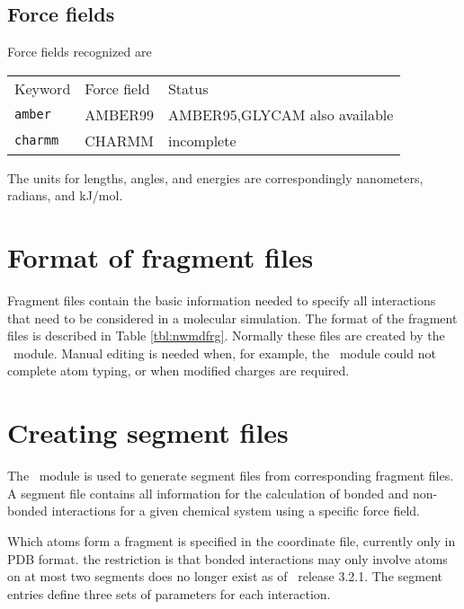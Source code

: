 \subsection{Force fields}
\label{sec:nwaforcefields}
Force fields recognized are
\begin{center}
\begin{tabular}{lll}
\hline
Keyword       & Force field   & Status \\
{\tt amber}   & AMBER99       & AMBER95,GLYCAM also available\\
{\tt charmm}  & CHARMM        & incomplete \\
\hline
\end{tabular}
\end{center}  
The units for lengths, angles, and energies are correspondingly
nanometers, radians, and kJ/mol.

\section{Format of fragment files}
Fragment files contain the basic information needed to specify all
interactions that need to be considered in a molecular simulation.
The format of the fragment files is described in Table \ref{tbl:nwmdfrg}.
Normally these files are created by the \prepare\ module. Manual
editing is needed when, for example, the \prepare\ module could not
complete atom typing, or when modified charges are required.

\section{Creating segment files}
\label{sec:nwanwsgm}
The \prepare\ module is used to generate segment files 
from corresponding fragment files. A segment file contains all
information for the calculation of bonded and non-bonded interactions
for a given chemical system using a specific force field.

Which atoms form a fragment is specified in the coordinate file,
currently only in PDB format.
the restriction is that bonded interactions may only involve atoms on at
most two segments does no longer exist as of \nwchem\ release 3.2.1. 
The segment entries define three sets of parameters
for each interaction. 

